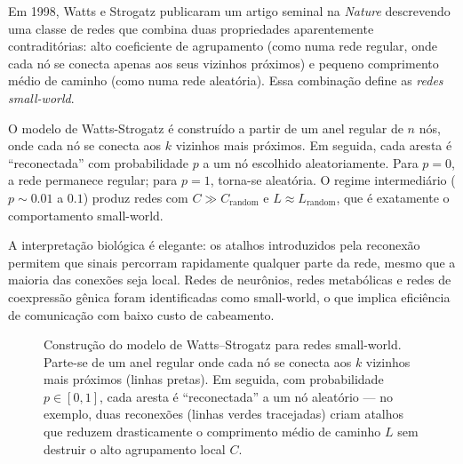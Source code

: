 Em 1998, Watts e Strogatz publicaram um artigo seminal na \textit{Nature} descrevendo
uma classe de redes que combina duas propriedades aparentemente contraditórias: alto
coeficiente de agrupamento (como numa rede regular, onde cada nó se conecta apenas
aos seus vizinhos próximos) e pequeno comprimento médio de caminho (como numa rede
aleatória). Essa combinação define as \emph{redes small-world}.

O modelo de Watts-Strogatz é construído a partir de um anel regular de $n$ nós, onde
cada nó se conecta aos $k$ vizinhos mais próximos. Em seguida, cada aresta é
``reconectada'' com probabilidade $p$ a um nó escolhido aleatoriamente. Para $p = 0$,
a rede permanece regular; para $p = 1$, torna-se aleatória. O regime intermediário
($p \sim 0.01$ a $0.1$) produz redes com $C \gg C_{\text{random}}$ e
$L \approx L_{\text{random}}$, que é exatamente o comportamento small-world.

A interpretação biológica é elegante: os atalhos introduzidos pela reconexão permitem
que sinais percorram rapidamente qualquer parte da rede, mesmo que a maioria das
conexões seja local. Redes de neurônios, redes metabólicas e redes de coexpressão gênica
foram identificadas como small-world, o que implica eficiência de comunicação com
baixo custo de cabeamento.

\begin{figure}[htbp]
\centering
{}
\caption{Construção do modelo de Watts--Strogatz para redes small-world. Parte-se de um anel regular onde cada nó se conecta aos $k$ vizinhos mais próximos (linhas pretas). Em seguida, com probabilidade $p \in [0, 1]$, cada aresta é ``reconectada'' a um nó aleatório --- no exemplo, duas reconexões (linhas verdes tracejadas) criam atalhos que reduzem drasticamente o comprimento médio de caminho $L$ sem destruir o alto agrupamento local $C$.}
\label{fig:03-smallworld}
\end{figure}

